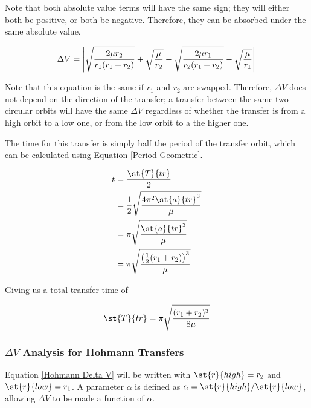 \documentclass[../basicOrbitalDynamics.tex]{subfiles}
\begin{document}
Note that both absolute value terms will have the same sign; they will either both be positive, or both be negative. Therefore, they can be absorbed under the same absolute value.

\begin{equation}\label{Hohmann Delta V}
    \Delta V = \left|\sqrt{\frac{2\mu{}r_2}{r_1(r_1+r_2)}}+\sqrt{\frac{\mu}{r_2}}-\sqrt{\frac{2\mu{}r_1}{r_2(r_1+r_2)}}-\sqrt{\frac{\mu}{r_1}}\right|\\
\end{equation}

Note that this equation is the same if $r_1$ and $r_2$ are swapped. Therefore, $\Delta V$ does not depend on the direction of the transfer; a transfer between the same two circular orbits will have the same $\Delta V$ regardless of whether the transfer is from a high orbit to a low one, or from the low orbit to a the higher one.

The time for this transfer is simply half the period of the transfer orbit, which can be calculated using Equation \eqref{Period Geometric}.

\begin{align*}
    t &= \frac{\st{T}{tr}}{2} \\
 &= \frac{1}{2}\sqrt{\frac{4\pi^2 \st{a}{tr}^3}{\mu}} \\
 &= \pi\sqrt{\frac{\st{a}{tr}^3}{\mu}} \\
 &= \pi\sqrt{\frac{\left(\frac{1}{2}(r_1+r_2)\right)^3}{\mu}} \\
\end{align*}

Giving us a total transfer time of

\begin{equation}\label{Hohmann time}
    \st{T}{tr}=\pi\sqrt{\frac{(r_1+r_2)^3}{8\mu}}
\end{equation}

\subsubsection{\texorpdfstring{$\Delta V$}{DeltaV} Analysis for Hohmann Transfers}\label{sec:DeltaV analysis for Hohmann}

Equation \eqref{Hohmann Delta V} will be written with $\st{r}{high}=r_2$ and $\st{r}{low}=r_1$. A parameter $\alpha$ is defined as $\alpha=\st{r}{high}/\st{r}{low}$, allowing $\Delta V$ to be made a function of $\alpha$.
\end{document}
